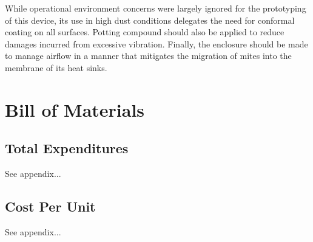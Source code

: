 While operational environment concerns were largely ignored for the prototyping of this device, its use in high dust conditions delegates the need for conformal coating on all surfaces.
Potting compound should also be applied to reduce damages incurred from excessive vibration.
Finally, the enclosure should be made to manage airflow in a manner that mitigates the migration of mites into the membrane of its heat sinks.

\section{Bill of Materials}
\subsection{Total Expenditures}
See appendix...
\subsection{Cost Per Unit}
See appendix...
